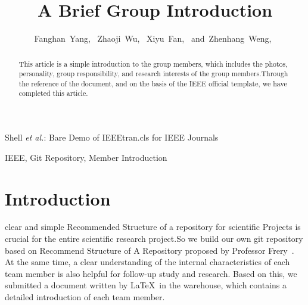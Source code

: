 \documentclass[journal]{IEEEtran}
\begin{document}
\title{A Brief Group Introduction}


\author{Fanghan~Yang,~
        Zhaoji~Wu,~
        Xiyu~Fan,~
        and~Zhenhang~Weng,~%
}


%
{Shell \MakeLowercase{\textit{et al.}}: Bare Demo of IEEEtran.cls for IEEE Journals}




\maketitle

\begin{abstract}
	This article is a simple introduction to the group members, which includes the photos, personality, group responsibility, and research interests of the group members.Through the reference of the document, and on the basis of the IEEE official template, we have completed this article.
\end{abstract}

\begin{IEEEkeywords}
IEEE, Git Repository, Member Introduction
\end{IEEEkeywords}




\IEEEpeerreviewmaketitle



\section{Introduction}

 clear and simple Recommended Structure of a repository for scientific Projects is crucial for the entire scientific research project.So we build our own git repository based on Recommend Structure of A Repository proposed by Professor Frery~\cite{2020A}.
At the same time, a clear understanding of the internal characteristics of each team member is also helpful for follow-up study and research. 
Based on this, we submitted a document written by \LaTeX\ in the warehouse, which contains a detailed introduction of each team member.
\end{document}
